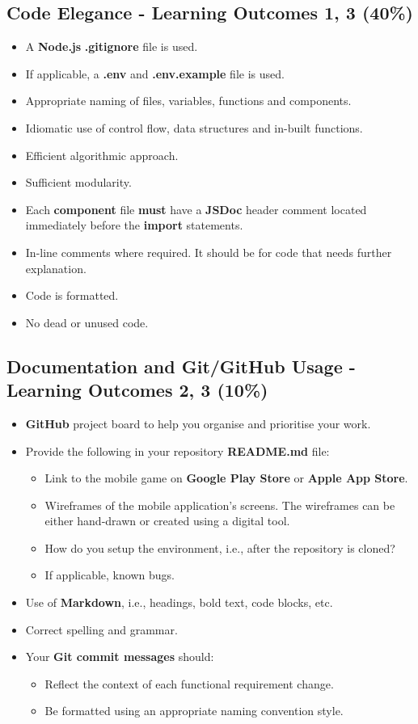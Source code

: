 \documentclass{article}
\begin{document}
\subsection*{Code Elegance - Learning Outcomes 1, 3 (40\%)}
\begin{itemize}
	\item A \textbf{Node.js} \textbf{.gitignore} file is used.
	\item If applicable, a \textbf{.env} and \textbf{.env.example} file is used.
  \item Appropriate naming of files, variables, functions and components.
	\item Idiomatic use of control flow, data structures and in-built functions.
  \item Efficient algorithmic approach.
  \item Sufficient modularity.
  \item Each \textbf{component} file \textbf{must} have a \textbf{JSDoc} header comment located immediately before the \textbf{import} statements.
	\item In-line comments where required. It should be for code that needs further explanation.
  \item Code is formatted.
\item No dead or unused code. 
\end{itemize}

\subsection*{Documentation and Git/GitHub Usage - Learning Outcomes 2, 3 (10\%)}
\begin{itemize}
	\item \textbf{GitHub} project board to help you organise and prioritise your work. 
    \item Provide the following in your repository \textbf{README.md} file:
    \begin{itemize} 
	  \item Link to the mobile game on \textbf{Google Play Store} or \textbf{Apple App Store}.
      \item Wireframes of the mobile application's screens. The wireframes can be either hand-drawn or created using a digital tool.
	  \item How do you setup the environment, i.e., after the repository is cloned?
      \item If applicable, known bugs.
    \end{itemize}
    \item Use of \textbf{Markdown}, i.e., headings, bold text, code blocks, etc.
    \item Correct spelling and grammar.
    \item Your \textbf{Git commit messages} should:
    \begin{itemize}
      \item Reflect the context of each functional requirement change.
      \item Be formatted using an appropriate naming convention style.
    \end{itemize}
\end{itemize}
\end{document}
